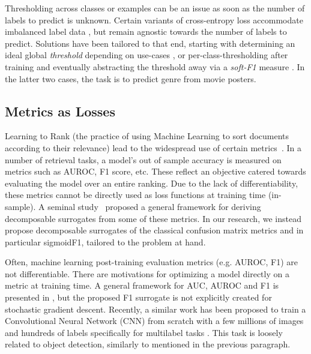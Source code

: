 Thresholding across classes or examples can be an issue as soon as the number
of labels to predict is unknown. Certain variants of cross-entropy loss
accommodate imbalanced label data  \cite{focalLoss}, but remain agnostic
towards the number of labels to predict. Solutions have been tailored to that
end, starting with determining an ideal global \emph{threshold} depending on
use-cases \cite{threshForF1}, or per-class-thresholding after training
\cite{moviePosters} and eventually abstracting the threshold away via a
\emph{soft-F1} measure \cite{softF1}. In the latter two cases, the task is to
predict genre from movie posters.

\subsection{Metrics as Losses}

Learning to Rank (the practice of using Machine Learning to sort documents
according to their relevance) lead to the widespread use of certain
metrics~\cite{LTR}. In a number of retrieval tasks, a model's out of sample
accuracy is measured on metrics such as AUROC, F1 score, etc. These reflect an
objective catered towards evaluating the model over an entire ranking. Due to
the lack of differentiability, these metrics cannot be directly used as loss
functions at training time (in-sample). A seminal
study~\cite{optimizableLosses} proposed a general framework for deriving
decomposable surrogates from some of these metrics. In our research, we
instead propose decomposable surrogates of the classical confusion matrix
metrics and in particular sigmoidF1, tailored to the problem at hand.

Often, machine learning post-training evaluation metrics (e.g. AUROC, F1) are
not differentiable. There are motivations  for
optimizing a model directly on a metric at training time. A general framework
for AUC, AUROC and F1 is presented in \cite{optimizableLosses}, but the
proposed F1 surrogate is not explicitly created for stochastic gradient
descent. Recently, a similar work has been proposed to train a Convolutional
Neural Network (CNN) from scratch with a few millions of images and hundreds
of labels specifically for multilabel tasks \cite{tencent}. This task is
loosely related to object detection, similarly to \cite{multitaskLabelImages}
mentioned in the previous paragraph.


